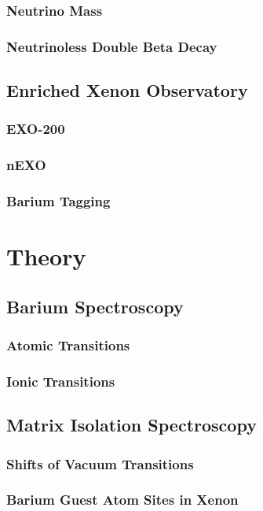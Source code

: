 \documentclass[doctor]{thesis} %
\begin{document}
\subsection{Neutrino Mass}
\subsection{Neutrinoless Double Beta Decay}
\section{Enriched Xenon Observatory}
\subsection{EXO-200}
\subsection{nEXO}
\subsection{Barium Tagging}



\chapter{Theory}
\label{chap:theory}

\section{Barium Spectroscopy}
\subsection{Atomic Transitions}
\subsection{Ionic Transitions}
\section{Matrix Isolation Spectroscopy}
\subsection{Shifts of Vacuum Transitions}
\subsection{Barium Guest Atom Sites in Xenon}
\end{document}
